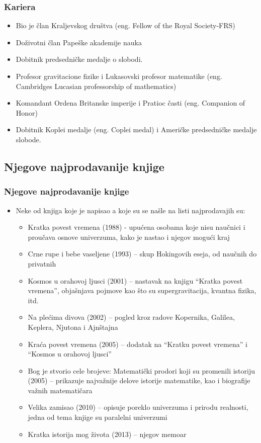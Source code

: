 \documentclass{beamer}
\begin{document}
\begin{frame}[fragile]\frametitle{Kariera}
\begin{itemize}	 \fontsize{9}{6}\selectfont	
\item Bio je član Kraljevskog društva (eng. Fellow of the Royal Society-FRS)
 \item Doživotni član Papeške akademije nauka
 \item Dobitnik predsedničke medalje o slobodi.
 \item Profesor gravitacione fizike i Lukasovski profesor matematike (eng. Cambridges Lucasian professorship of mathematics)
 \item Komandant Ordena Britanske imperije  i Pratioc časti (eng. Companion of Honor) \item Dobitnik Koplei medalje (eng. Coplei medal) i Američke predsedničke medalje slobode.
\end{itemize}
\end{frame}

\subsection{Njegove najprodavanije knjige}

\begin{frame}[fragile]\frametitle{ Njegove najprodavanije knjige}
	\begin{itemize}	\fontsize{9}{6}\selectfont	
		\item Neke od knjiga koje je napisao a koje su se našle na listi najprodavajih su:
		\begin{itemize}\fontsize{9}{6}\selectfont
 \item Kratka povest vremena (1988) - upućena osobama koje nisu naučnici i proučava osnove univerzuma, kako je nastao i njegov mogući kraj
 \item Crne rupe i bebe vaseljene (1993) – skup Hokingovih eseja, od naučnih do privatnih
 \item Kosmos u orahovoj ljusci (2001) – nastavak na knjigu “Kratka povest vremena”, objašnjava pojmove kao što su supergravitacija, kvantna fizika, itd.
 \item Na plećima divova (2002) – pogled kroz radove Kopernika, Galilea, Keplera, Njutona i Ajnštajna
 \item Kraća povest vremena (2005) – dodatak na “Kratku povest vremena” i “Kosmos u orahovoj ljusci”
 \item Bog je stvorio cele brojeve: Matematički prodori koji su promenili istoriju (2005) –  prikazuje najvažnije delove istorije matematike, kao i biografije važnih matematičara
 \item Velika zamisao (2010) – opisuje poreklo univerzuma i prirodu realnosti, jedna od tema knjige su paralelni univerzumi
 \item Kratka istorija mog života (2013) – njegov memoar
\end{itemize}
\end{itemize}
\end{frame}
\end{document}
